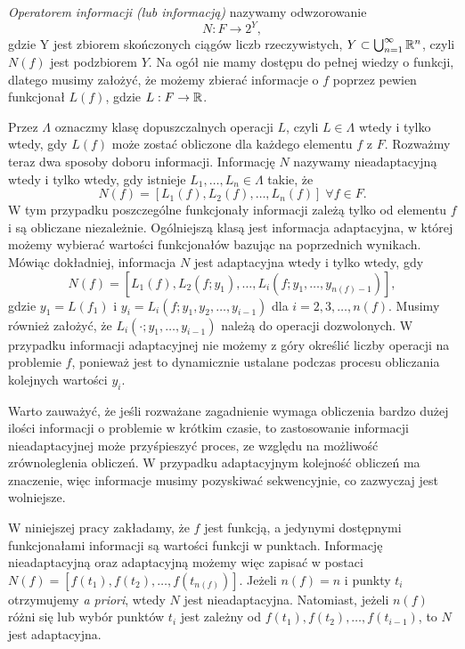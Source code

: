 \documentclass[oik, pdftex, man]{mgrwms}
\begin{document}
    \textit{Operatorem informacji (lub informacją)} nazywamy odwzorowanie
    \begin{equation*}
        N : F \rightarrow 2^{Y},
    \end{equation*}
    gdzie Y jest zbiorem skończonych ciągów liczb rzeczywistych, $ Y \subset \bigcup^{\infty}_{n=1} \mathbb{R}^{n}$, czyli $N(f)$ jest podzbiorem $Y$.
    Na ogół nie mamy dostępu do pełnej wiedzy o funkcji, dlatego musimy założyć, że możemy zbierać informacje o $f$ poprzez pewien funkcjonał $L(f)$, gdzie $L : F \rightarrow \mathbb{R}$.
    
    Przez $\Lambda$ oznaczmy klasę dopuszczalnych operacji $L$, czyli $L \in \Lambda$ wtedy i tylko wtedy, gdy $L(f)$ może zostać obliczone dla każdego elementu $f$ z $F$. Rozważmy teraz dwa sposoby doboru informacji. Informację $N$ nazywamy nieadaptacyjną wtedy i tylko wtedy, gdy istnieje $L_{1}, \ldots, L_{n} \in \Lambda$ takie, że
    \begin{equation*}
        N(f) = \left[ L_{1}(f), L_{2}(f), \ldots, L_{n}(f) \right] \; \forall f \in F.
    \end{equation*}
    W tym przypadku poszczególne funkcjonały informacji zależą tylko od elementu $f$ i są obliczane niezależnie.
    Ogólniejszą klasą jest informacja adaptacyjna, w której możemy wybierać wartości funkcjonałów bazując na poprzednich wynikach. Mówiąc dokładniej, informacja $N$ jest adaptacyjna wtedy i tylko wtedy, gdy
    \begin{equation*}
        N(f) = \left[ L_{1}(f), L_{2}(f; y_{1}), \ldots, L_{i}(f; y_{1}, \ldots, y_{n(f)-1}) \right],
    \end{equation*}
    gdzie $y_{1} = L(f_{1})$ i $y_{i} = L_{i}(f; y_{1}, y_{2}, \ldots, y_{i-1})$ dla $i=2,3,\ldots,n(f)$. Musimy również założyć, że $L_{i}(\cdot;y_{1}, \ldots, y_{i-1})$ należą do operacji dozwolonych. W przypadku informacji adaptacyjnej nie możemy z góry określić liczby operacji na problemie $f$, ponieważ jest to dynamicznie ustalane podczas procesu obliczania kolejnych wartości $y_{i}$.

    Warto zauważyć, że jeśli rozważane zagadnienie wymaga obliczenia bardzo dużej ilości informacji o problemie w krótkim czasie, to zastosowanie informacji nieadaptacyjnej może przyśpieszyć proces, ze względu na możliwość zrównoleglenia obliczeń. W przypadku adaptacyjnym kolejność obliczeń ma znaczenie, więc informacje musimy pozyskiwać sekwencyjnie, co zazwyczaj jest wolniejsze.

    W niniejszej pracy zakładamy, że $f$ jest funkcją, a jedynymi dostępnymi funkcjonałami informacji są wartości funkcji w punktach. Informację nieadaptacyjną oraz adaptacyjną możemy więc zapisać w postaci $N(f) = \left[ f(t_{1}), f(t_{2}), \ldots, f(t_{n(f)}) \right]$. Jeżeli $n(f) = n$ i punkty $t_{i}$ otrzymujemy \textit{a priori}, wtedy $N$ jest nieadaptacyjna. Natomiast, jeżeli $n(f)$ różni się lub wybór punktów $t_{i}$ jest zależny od $f(t_{1}), f(t_{2}), \ldots, f(t_{i-1})$, to $N$ jest adaptacyjna.
\end{document}
